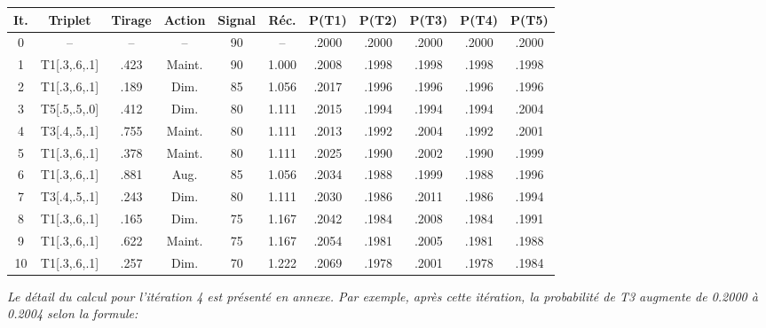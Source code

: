\documentclass[a4paper,11pt]{article}
\begin{document}
\begin{mdframed}
\vspace{0.5cm}
\centering
\normalsize
\setlength{\tabcolsep}{1pt}
\begin{tabular}{|c|c|c|c|c|c|c|c|c|c|c|}
  \hline
  \textbf{It.} & \textbf{Triplet}    & \textbf{Tirage} & \textbf{Action} 
    & \textbf{Signal} & \textbf{Réc.}
    & \textbf{P(T1)} & \textbf{P(T2)} & \textbf{P(T3)}
    & \textbf{P(T4)} & \textbf{P(T5)} \\
  \hline
  0  & –                  & –     & –      & 90  & –     & .2000 & .2000 & .2000 & .2000 & .2000 \\
  \hline
  1  & T1[.3,.6,.1]       & .423  & Maint. & 90  & 1.000 & .2008 & .1998 & .1998 & .1998 & .1998 \\
  \hline
  2  & T1[.3,.6,.1]       & .189  & Dim.   & 85  & 1.056 & .2017 & .1996 & .1996 & .1996 & .1996 \\
  \hline
  3  & T5[.5,.5,.0]       & .412  & Dim.   & 80  & 1.111 & .2015 & .1994 & .1994 & .1994 & .2004 \\
  \hline
  4  & T3[.4,.5,.1]       & .755  & Maint. & 80  & 1.111 & .2013 & .1992 & .2004 & .1992 & .2001 \\
  \hline
  5  & T1[.3,.6,.1]       & .378  & Maint. & 80  & 1.111 & .2025 & .1990 & .2002 & .1990 & .1999 \\
  \hline
  6  & T1[.3,.6,.1]       & .881  & Aug.   & 85  & 1.056 & .2034 & .1988 & .1999 & .1988 & .1996 \\
  \hline
  7  & T3[.4,.5,.1]       & .243  & Dim.   & 80  & 1.111 & .2030 & .1986 & .2011 & .1986 & .1994 \\
  \hline
  8  & T1[.3,.6,.1]       & .165  & Dim.   & 75  & 1.167 & .2042 & .1984 & .2008 & .1984 & .1991 \\
  \hline
  9  & T1[.3,.6,.1]       & .622  & Maint. & 75  & 1.167 & .2054 & .1981 & .2005 & .1981 & .1988 \\
  \hline
  10 & T1[.3,.6,.1]       & .257  & Dim.   & 70  & 1.222 & .2069 & .1978 & .2001 & .1978 & .1984 \\
  \hline
\end{tabular}

\label{tab:exemple_apprentissage}

\vspace{1em}

{\small\itshape
Le détail du calcul pour l'itération 4 est présenté en annexe. Par exemple, après cette itération, la probabilité de T3 augmente de 0.2000 à 0.2004 selon la formule:
}


\end{mdframed}
\end{document}
